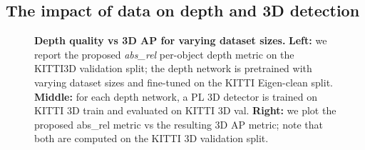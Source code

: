 \subsection{The impact of data on depth and 3D detection}
\label{subsec:depth_pretraining}

\begin{figure}[t!]
\centering

\caption{
\textbf{Depth quality vs 3D AP for varying dataset sizes.} \textbf{Left:} we report the proposed \textit{abs\_rel} per-object depth metric on the KITTI3D validation split; the depth network is pretrained with varying dataset sizes and fine-tuned on the KITTI Eigen-clean split. \textbf{Middle:} for each depth network, a PL 3D detector is trained on KITTI 3D train and evaluated on KITTI 3D val. \textbf{Right:} we plot the proposed abs\_rel metric vs the resulting 3D AP metric; note that both are computed on the KITTI 3D validation split.
}
\label{fig:scaling_laws_packnet}
\end{figure}


